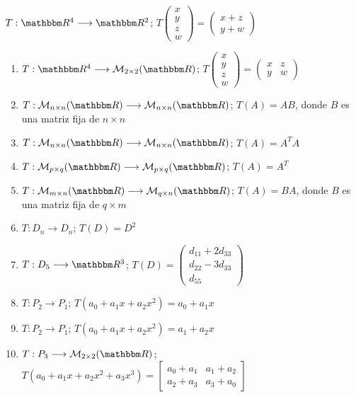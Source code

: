 \begin{tasks}[
    style=enumerate,
    label-offset = 3mm,
    ]
    \task $T: \RR[4] \longrightarrow \RR[2]$; $T\begin{pmatrix*}x \\ y \\ z \\ w\end{pmatrix*}=\begin{pmatrix*}x+z \\ y+w\end{pmatrix*}$
\end{tasks}
\begin{enumerate}[start=18]
    \item $T: \RR[4] \longrightarrow \mathcal{M}_{2 \times 2}(\RR)$; $T\begin{pmatrix*}x \\ y \\ z \\ w\end{pmatrix*}=\begin{pmatrix*}x & z \\ y & w\end{pmatrix*}$
    \item $T: \mathcal{M}_{n \times n}(\RR) \longrightarrow \mathcal{M}_{n \times n}(\RR)$; $T(A)=A B$, donde $B$ es una matriz fija de $n \times n$
    \item $T: \mathcal{M}_{n \times n}(\RR) \longrightarrow \mathcal{M}_{n \times n}(\RR)$; $T(A)=A^{T} A$
    \item $T: \mathcal{M}_{p \times q}(\RR) \longrightarrow \mathcal{M}_{p \times q}(\RR)$; $T(A)=A^{T}$
    \item $T: \mathcal{M}_{m \times n}(\RR) \longrightarrow \mathcal{M}_{q \times n}(\RR)$; $T(A)=B A$, donde $B$ es una matriz fija de $q \times m$
    \item $T: D_{n} \longrightarrow D_{n}$; $T(D)=D^{2}$
    \item $T: D_{5} \longrightarrow \RR[3]$; $T(D)=\begin{pmatrix*}d_{11}+2 d_{33} \\ d_{22}-3 d_{33} \\ d_{55}\end{pmatrix*}$
    \item $T: P_{2} \longrightarrow P_{1}$; $T\left(a_{0}+a_{1} x+a_{2} x^{2}\right)=a_{0}+a_{1} x$
    \item $T: P_{2} \longrightarrow P_{1}$; $T\left(a_{0}+a_{1} x+a_{2} x^{2}\right)=a_{1}+a_{2} x$
    \item $T: P_{3} \longrightarrow \mathcal{M}_{2 \times 2}(\RR)$; $T\left(a_{0}+a_{1} x+a_{2} x^{2}+a_{3} x^{3}\right)=\begin{bmatrix*}a_{0}+a_{1} & a_{1}+a_{2} \\ a_{2}+a_{3} & a_{3}+a_{0}\end{bmatrix*}$

\end{enumerate}
